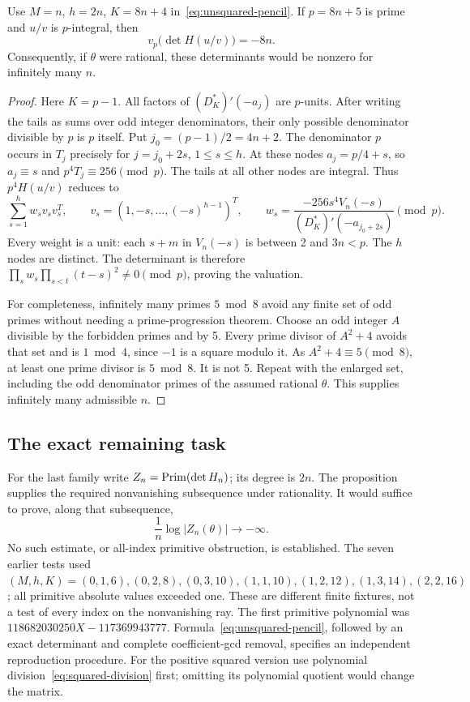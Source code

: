 \begin{proposition}\label{prop:quarter-nonzero}
Use $M=n$, $h=2n$, $K=8n+4$ in~\eqref{eq:unsquared-pencil}.
If $p=8n+5$ is prime and $u/v$ is $p$-integral, then
\[
 v_p\bigl(\det H(u/v)\bigr)=-8n.
\]
Consequently, if $\theta$ were rational, these determinants would be
nonzero for infinitely many $n$.
\end{proposition}
\begin{proof}
Here $K=p-1$. All factors of $(D_K^*)'(-a_j)$ are $p$-units.
After writing the tails as sums over odd integer denominators, their
only possible denominator divisible by $p$ is $p$ itself. Put
$j_0=(p-1)/2=4n+2$. The denominator $p$ occurs in $T_j$ precisely for
$j=j_0+2s$, $1\leq s\leq h$. At these nodes $a_j=p/4+s$,
so $a_j\equiv s$ and $p^4T_j\equiv256\pmod p$.
The tails at all other nodes are integral. Thus $p^4H(u/v)$ reduces to
\[
 \sum_{s=1}^h w_s v_sv_s^T,
 \qquad v_s=(1,-s,\ldots,(-s)^{h-1})^T,\qquad
 w_s=\frac{-256s^4V_n(-s)}{(D_K^*)'(-a_{j_0+2s})}\pmod p.
\]
Every weight is a unit: each $s+m$ in $V_n(-s)$ is between 2 and
$3n<p$. The $h$ nodes are distinct. The determinant is therefore
$\prod_s w_s\prod_{s<t}(t-s)^2\ne0\pmod p$, proving the valuation.

For completeness, infinitely many primes $5\bmod8$ avoid any finite
set of odd primes without needing a prime-progression theorem. Choose
an odd integer $A$ divisible by the forbidden primes and by 5.
Every prime divisor of $A^2+4$ avoids that set and is $1\bmod4$,
since $-1$ is a square modulo it. As $A^2+4\equiv5\pmod8$, at least
one prime divisor is $5\bmod8$. It is not 5. Repeat with the enlarged
set, including the odd denominator primes of the assumed rational
$\theta$. This supplies infinitely many admissible $n$.
\end{proof}

\subsection{The exact remaining task}
For the last family write $Z_n=\operatorname{Prim}(\det H_n)$; its degree is $2n$.
The proposition supplies the required nonvanishing subsequence under
rationality. It would suffice to prove, along that subsequence,
\[
 \frac1n\log|Z_n(\theta)|\longrightarrow-\infty.
\]
No such estimate, or all-index primitive obstruction, is established.
The seven earlier tests used $(M,h,K)=(0,1,6),(0,2,8),(0,3,10),
(1,1,10),(1,2,12),(1,3,14),(2,2,16)$; all primitive absolute values
exceeded one. These are different finite fixtures, not a test of every
index on the nonvanishing ray. The first primitive polynomial was
$118682030250X-117369943777$.
Formula~\eqref{eq:unsquared-pencil}, followed by an exact determinant
and complete coefficient-gcd removal, specifies an independent
reproduction procedure. For the positive squared version use polynomial
division~\eqref{eq:squared-division} first; omitting its polynomial
quotient would change the matrix.
